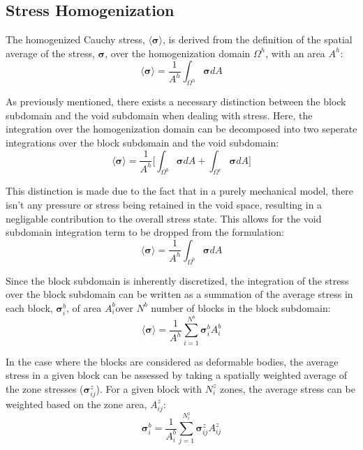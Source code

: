 \subsection{Stress Homogenization}
The homogenized Cauchy stress, $\langle \boldsymbol{\sigma} \rangle$, is derived from the definition of the spatial average of the stress, $\boldsymbol{\sigma}$, over the homogenization domain $\Omega^h$, with an area $A^h$:
\begin{equation}
\label{eqn:stress1}
\langle \boldsymbol{\sigma} \rangle = \frac{1}{A^h} \int_{\Omega^h} \boldsymbol{\sigma} {dA}
\end{equation}

As previously mentioned, there exists a necessary distinction between the block subdomain and the void subdomain when dealing with stress. Here, the integration over the homogenization domain can be decomposed into two seperate integrations over the block subdomain and the void subdomain:
\begin{equation}
\label{eqn:stress2}
\langle \boldsymbol{\sigma} \rangle = 
\frac{1}{A^h} \bigg \lbrack {\int_{\Omega^{b}} \boldsymbol{\sigma} {dA} + 
\int_{\Omega^{v}} \boldsymbol{\sigma} {dA}} \bigg \rbrack
\end{equation}

This distinction is made due to the fact that in a purely mechanical model, there isn't any pressure or stress being retained in the void space, resulting in a negligable contribution to the overall stress state. This allows for the void subdomain integration term to be dropped from the formulation:
\begin{equation}
\label{eqn:stress2a}
\langle \boldsymbol{\sigma} \rangle = 
\frac{1}{A^h} \int_{\Omega^{b}} \boldsymbol{\sigma} {dA}
\end{equation}

Since the block subdomain is inherently discretized, the integration of the stress over the block subdomain can be written as a summation of the average stress in each block, $\boldsymbol{\sigma}^b_i$, of area $A^b_i$over $N^b$ number of blocks in the block subdomain:
\begin{equation}
\label{eqn:stress3}
\langle \boldsymbol{\sigma} \rangle = 
\frac{1}{A^h} \sum_{i=1}^{N^{b}} \boldsymbol{\sigma}_{i}^b A^{b}_{i} 
\end{equation}

In the case where the blocks are considered as deformable bodies, the average stress in a given block can be assessed by taking a spatially weighted average of the zone stresses ($\boldsymbol{\sigma}^z_{ij}$). For a given block with $N_i^z$ zones, the average stress can be weighted based on the zone area, $A^{z}_{ij}$:
\begin{equation}
\label{eqn:stress3a}
\boldsymbol{\sigma}_{i}^b = 
\frac{1}{A^b_i} \sum_{j=1}^{N^{z}_i} \boldsymbol{\sigma}^z_{ij} A^{z}_{ij} 
\end{equation}

